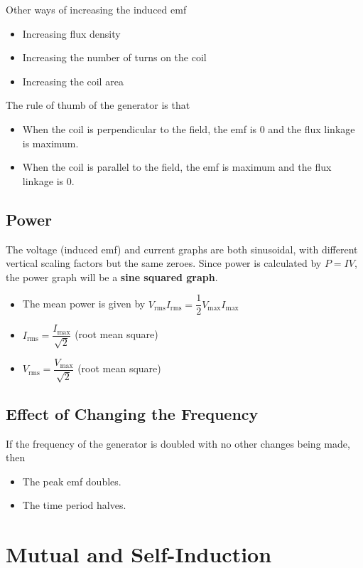\documentclass[a4paper,12pt]{article}
\let\oldsection\section
\renewcommand\section{\clearpage\oldsection}
\begin{document}
Other ways of increasing the induced emf
\begin{itemize}
  \item Increasing flux density
  \item Increasing the number of turns on the coil
  \item Increasing the coil area
\end{itemize}

The rule of thumb of the generator is that
\begin{itemize}
  \item When the coil is perpendicular to the field, the emf is 0 and the flux linkage is maximum.
  \item When the coil is parallel to the field, the emf is maximum and the flux linkage is 0.
\end{itemize}

\subsection{Power}

The voltage (induced emf) and current graphs are both sinusoidal, with different vertical scaling factors but the same zeroes. Since power is calculated by $P = IV$, the power graph will be a \textbf{sine squared graph}.
\begin{itemize}
  \item The mean power is given by $V_\text{rms}I_\text{rms} = \dfrac{1}{2}V_{\text{max}}I_{\text{max}}$
  \item $I_{\text{rms}} = \dfrac{I_{\text{max}}}{\sqrt{2}}$ (root mean square)
  \item $V_{\text{rms}} = \dfrac{V_{\text{max}}}{\sqrt{2}}$ (root mean square)
\end{itemize}

\subsection{Effect of Changing the Frequency}

If the frequency of the generator is doubled with no other changes being made, then
\begin{itemize}
  \item The peak emf doubles.
  \item The time period halves.
\end{itemize}

\section{Mutual and Self-Induction}
\end{document}
